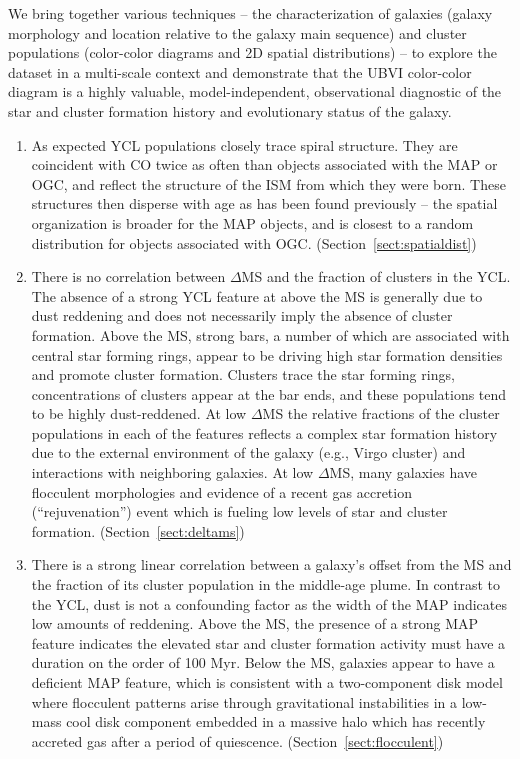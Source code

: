 \documentclass[linenumbers]{aastex63}
\begin{document}
We bring together various techniques -- the characterization of galaxies (galaxy morphology and location relative to the galaxy main sequence) and cluster populations (color-color diagrams and 2D spatial distributions) -- to explore the dataset in a multi-scale context and demonstrate that the UBVI color-color diagram is a highly valuable, model-independent, observational diagnostic of the star and cluster formation history and evolutionary status of the galaxy.
\begin{enumerate}
\item As expected YCL populations closely trace spiral structure.  They are coincident with CO twice as often than objects associated with the MAP or OGC, and reflect the structure of the ISM from which they were born. These structures then disperse with age as has been found previously -- the spatial organization is broader for the MAP objects, and is closest to a random distribution for objects associated with OGC.  (Section~\ref{sect:spatialdist})

\item There is no correlation between $\Delta$MS and the fraction of clusters in the YCL. The absence of a strong YCL feature at above the MS is generally due to dust reddening and does not necessarily imply the absence of cluster formation.  Above the MS, strong bars, a number of which are associated with central star forming rings, appear to be driving high star formation densities and promote cluster formation. Clusters trace the star forming rings, concentrations of clusters appear at the bar ends, and these populations tend to be highly dust-reddened.  At low $\Delta$MS the relative fractions of the cluster populations in each of the features reflects a complex star formation history due to the external environment of the galaxy (e.g., Virgo cluster) and interactions with neighboring galaxies.  At low $\Delta$MS, many galaxies have flocculent morphologies and evidence of a recent gas accretion (``rejuvenation'') event which is fueling low levels of star and cluster formation.  (Section~\ref{sect:deltams})
\item  There is a strong linear correlation between a galaxy's offset from the MS and the fraction of its cluster population in the middle-age plume.  In contrast to the YCL, dust is not a confounding factor as the width of the MAP indicates low amounts of reddening.  Above the MS, the presence of a strong MAP feature indicates the elevated star and cluster formation activity must have a duration on the order of 100 Myr.  Below the MS, galaxies appear to have a deficient MAP feature, which is consistent with a two-component disk model where flocculent patterns arise through gravitational instabilities in a low-mass cool disk component embedded in
a massive halo which has recently accreted gas after a period of quiescence.    (Section~\ref{sect:flocculent})



\end{enumerate}
\end{document}
